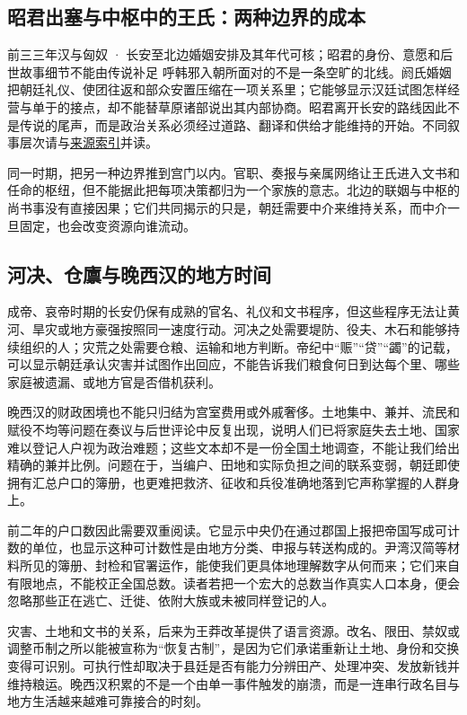 \subsection{昭君出塞与中枢中的王氏：两种边界的成本}
\begin{event}{}{前三三年}{汉与匈奴 · 长安至北边}{婚姻安排及其年代可核；昭君的身份、意愿和后世故事细节不能由传说补足}
呼韩邪入朝所面对的不是一条空旷的北线。阏氏婚姻把朝廷礼仪、使团往返和部众安置压缩在一项关系里；它能够显示汉廷试图怎样经营与单于的接点，却不能替草原诸部说出其内部协商。昭君离开长安的路线因此不是传说的尾声，而是政治关系必须经过道路、翻译和供给才能维持的开始。不同叙事层次请与\hyperref[app:sources]{来源索引}并读。

同一时期，把另一种边界推到宫门以内。官职、奏报与亲属网络让王氏进入文书和任命的枢纽，但不能据此把每项决策都归为一个家族的意志。北边的联姻与中枢的尚书事没有直接因果；它们共同揭示的只是，朝廷需要中介来维持关系，而中介一旦固定，也会改变资源向谁流动。
\end{event}

\subsection{河决、仓廪与晚西汉的地方时间}

成帝、哀帝时期的长安仍保有成熟的官名、礼仪和文书程序，但这些程序无法让黄河、旱灾或地方豪强按照同一速度行动。河决之处需要堤防、役夫、木石和能够持续组织的人；灾荒之处需要仓粮、运输和地方判断。帝纪中“赈”“贷”“蠲”的记载，可以显示朝廷承认灾害并试图作出回应，不能告诉我们粮食何日到达每个里、哪些家庭被遗漏、或地方官是否借机获利。

晚西汉的财政困境也不能只归结为宫室费用或外戚奢侈。土地集中、兼并、流民和赋役不均等问题在奏议与后世评论中反复出现，说明人们已将家庭失去土地、国家难以登记人户视为政治难题；这些文本却不是一份全国土地调查，不能让我们给出精确的兼并比例。问题在于，当编户、田地和实际负担之间的联系变弱，朝廷即使拥有汇总户口的簿册，也更难把救济、征收和兵役准确地落到它声称掌握的人群身上。

前二年的户口数因此需要双重阅读。它显示中央仍在通过郡国上报把帝国写成可计数的单位，也显示这种可计数性是由地方分类、申报与转送构成的。尹湾汉简等材料所见的簿册、封检和官署运作，能使我们更具体地理解数字从何而来；它们来自有限地点，不能校正全国总数。读者若把一个宏大的总数当作真实人口本身，便会忽略那些正在逃亡、迁徙、依附大族或未被同样登记的人。

灾害、土地和文书的关系，后来为王莽改革提供了语言资源。改名、限田、禁奴或调整币制之所以能被宣称为“恢复古制”，是因为它们承诺重新让土地、身份和交换变得可识别。可执行性却取决于县廷是否有能力分辨田产、处理冲突、发放新钱并维持粮运。晚西汉积累的不是一个由单一事件触发的崩溃，而是一连串行政名目与地方生活越来越难可靠接合的时刻。


